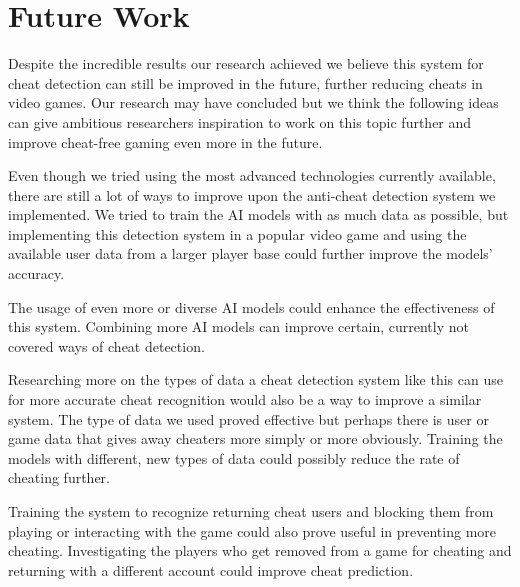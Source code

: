 \section{Future Work}
\label{ch:future}

Despite the incredible results our research achieved we believe this system for cheat detection can still be improved in the future, further reducing cheats in video games. Our research may have concluded but we think the following ideas can give ambitious researchers inspiration to work on this topic further and improve cheat-free gaming even more in the future.

Even though we tried using the most advanced technologies currently available, there are still a lot of ways to improve upon the anti-cheat detection system we implemented. We tried to train the AI models with as much data as possible, but implementing this detection system in a popular video game and using the available user data from a larger player base could further improve the models’ accuracy. 

The usage of even more or diverse AI models could enhance the effectiveness of this system. Combining more AI models can improve certain, currently not covered ways of cheat detection. 

Researching more on the types of data a cheat detection system like this can use for more accurate cheat recognition would also be a way to improve a similar system. The type of data we used proved effective but perhaps there is user or game data that gives away cheaters more simply or more obviously. Training the models with different, new types of data could possibly reduce the rate of cheating further. 

Training the system to recognize returning cheat users and blocking them from playing or interacting with the game could also prove useful in preventing more cheating. Investigating the players who get removed from a game for cheating and returning with a different account could improve cheat prediction.